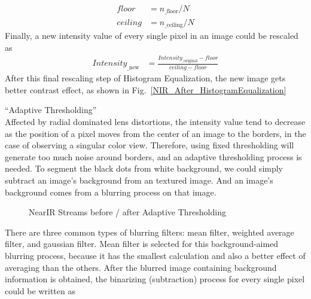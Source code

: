 %
\begin{equation}
%
\begin{aligned}
floor &=  n_{\text{\_floor}} / N%
\\%
ceiling &=  n_{\text{\_ceiling}} / N
\end{aligned}
\label{intensityFloorCeilingDetermination}
%
\end{equation}%
%
Finally, a new intensity value of every single pixel in an image could be rescaled as
%
\begin{equation}
%
\begin{aligned}
Intensity_{\text{\_new}} &= \frac{Intensity_{\text{\_original}} - floor}{ceiling - floor} 
\end{aligned}
%
\end{equation}%
%
After this final rescaling step of Histogram Equalization, the new image gets better contrast effect, as shown in Fig.~\ref{NIR_After_HistogramEqualization}%
\\\par%
 \qquad \enquote{Adaptive Thresholding}\\%
Affected by radial dominated lens distortions, the intensity value tend to decrease as the position of a pixel moves from the center of an image to the borders, in the case of observing a singular color view. Therefore, using fixed thresholding will generate too much noise around borders, and an adaptive thresholding process is needed. To segment the black dots from white background, we could simply subtract an image's background from an textured image. And an image's background comes from a blurring process on that image. \par%
%
 \begin{figure}[t]
\hspace*{-0.5cm}
\centering
{}
\caption{NearIR Streams before / after Adaptive Thresholding}
\label{Adaptive_Thresholding}
\end{figure}%
\par%
%
There are three common types of blurring filters: mean filter, weighted average filter, and gaussian filter. Mean filter is selected for this background-aimed blurring process, because it has the smallest calculation and also a better effect of averaging than the others. After the blurred image containing background information is obtained, the binarizing (subtraction) process for every single pixel could be written as

